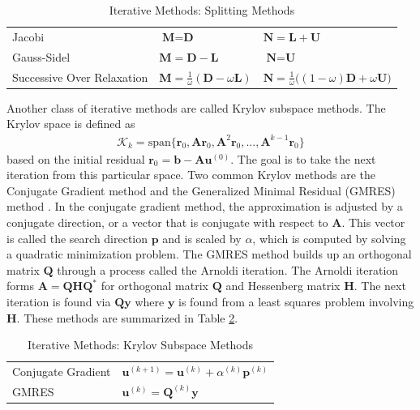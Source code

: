 \begin{table}[h!]
    \centering
    \begin{tabular}{ | l | l | l |}
        \hline
        Jacobi & $\textbf{M} = \textbf{D}$ & $\textbf{N} = \textbf{L} + \textbf{U}$ \\
        Gauss-Sidel & $\textbf{M} = \textbf{D} - \textbf{L}$ & $\textbf{N} = \textbf{U}$ \\
        Successive Over Relaxation & $\textbf{M} = \frac{1}{\omega}(\textbf{D} - \omega \textbf{L})$ & $\textbf{N} = \frac{1}{\omega} \big( (1 - \omega) \textbf{D} + \omega \textbf{U} \big)$ \\
        \hline
    \end{tabular}
    \caption{Iterative Methods: Splitting Methods}
    \label{tab:splitting}
\end{table}

Another class of iterative methods are called Krylov subspace methods. The Krylov space is defined as
\begin{align}
\mathcal{K}_k = \text{span} \{ \textbf{r}_0, \textbf{A} \textbf{r}_0, \textbf{A}^2 \textbf{r}_0, ..., \textbf{A}^{k-1} \textbf{r}_0 \}
\end{align}
based on the initial residual $\textbf{r}_0 = \textbf{b} - \textbf{A} \textbf{u}^{(0)}$. The goal is to take the next iteration from this particular space. Two common Krylov methods are the Conjugate Gradient method \citep{hestenes1952methods} and the Generalized Minimal Residual (GMRES) method \citep{saad1986gmres}. In the conjugate gradient method, the approximation is adjusted by a conjugate direction, or a vector that is conjugate with respect to $\textbf{A}$. This vector is called the search direction $\textbf{p}$ and is scaled by $\alpha$, which is computed by solving a quadratic minimization problem. The GMRES method builds up an orthogonal matrix $\textbf{Q}$ through a process called the Arnoldi iteration. The Arnoldi iteration forms $\textbf{A} = \textbf{Q} \textbf{H} \textbf{Q}^*$ for orthogonal matrix $\textbf{Q}$ and Hessenberg matrix $\textbf{H}$. The next iteration is found via $\textbf{Q} \textbf{y}$ where $\textbf{y}$ is found from a least squares problem involving $\textbf{H}$. These methods are summarized in Table \ref{tab:ksm}.

\begin{table}[h!]
    \centering
    \begin{tabular}{ | l | l |}
        \hline
        Conjugate Gradient & $\textbf{u}^{(k+1)} = \textbf{u}^{(k)} + \alpha^{(k)} \textbf{p}^{(k)}$ \\
        GMRES & $\textbf{u}^{(k)} = \textbf{Q}^{(k)} \textbf{y}$ \\
        \hline
    \end{tabular}
    \caption{Iterative Methods: Krylov Subspace Methods}
    \label{tab:ksm}
\end{table}

